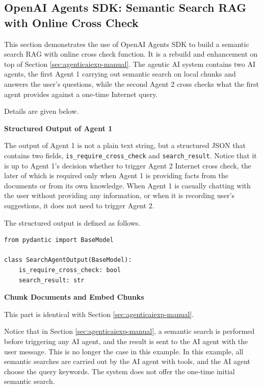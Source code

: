 \subsection{OpenAI Agents SDK: Semantic Search RAG with Online Cross Check} \label{sec:agentaiexp-agentsdk}

This section demonstrates the use of OpenAI Agents SDK to build a semantic search RAG with online cross check function. It is a rebuild and enhancement on top of Section \ref{sec:agenticaiexp-manual}. The agentic AI system contains two AI agents, the first Agent 1 carrying out semantic search on local chunks and answers the user's questions, while the second Agent 2 cross checks what the first agent provides against a one-time Internet query.

Details are given below.

\vspace{0.1in}
\noindent \textbf{Structured Output of Agent 1}
\vspace{0.1in}

The output of Agent 1 is not a plain text string, but a structured JSON that contains two fields, \verb|is_require_cross_check| and \verb|search_result|. Notice that it is up to Agent 1's decision whether to trigger Agent 2 Internet cross check, the later of which is required only when Agent 1 is providing facts from the documents or from its own knowledge. When Agent 1 is casually chatting with the user without providing any information, or when it is recording user's suggestions, it does not need to trigger Agent 2.

The structured output is defined as follows.
\begin{lstlisting}
from pydantic import BaseModel

class SearchAgentOutput(BaseModel):
    is_require_cross_check: bool
    search_result: str
\end{lstlisting}

\vspace{0.1in}
\noindent \textbf{Chunk Documents and Embed Chunks}
\vspace{0.1in}

This part is identical with Section \ref{sec:agenticaiexp-manual}.

Notice that in Section \ref{sec:agenticaiexp-manual}, a semantic search is performed before triggering any AI agent, and the result is sent to the AI agent with the user message. This is no longer the case in this example. In this example, all semantic searches are carried out by the AI agent with tools, and the AI agent choose the query keywords. The system does not offer the one-time initial semantic search.

